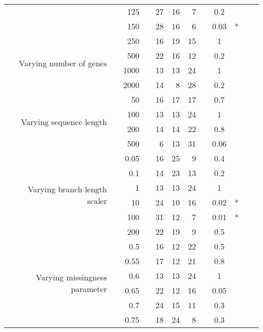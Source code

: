 \begin{table}[!h]
\begin{tabular}{r r r l r r r l c c c l}
   & & 125 & & 27 & 16 & 7 & & 0.2 &  &  &  \\
   & & 150 & & 28 & 16 & 6 & & 0.03 & * &  &  \\
\midrule
\multirow{ 4}{2cm}{Varying number of genes}
   & & 250 & & 16 & 19 & 15 & & 1 &  &  &  \\
   & & 500 & & 22 & 16 & 12 & & 0.2 &  &  &  \\
   & & 1000 & & 13 & 13 & 24 & & 1 &  &  &  \\
   & & 2000 & & 14 & 8 & 28 & & 0.2 &  &  &  \\
\midrule
\multirow{ 4}{2cm}{Varying sequence length}
   & & 50 & & 16 & 17 & 17 & & 0.7 &  &  &  \\
   & & 100 & & 13 & 13 & 24 & & 1 &  &  &  \\
   & & 200 & & 14 & 14 & 22 & & 0.8 &  &  &  \\
   & & 500 & & 6 & 13 & 31 & & 0.06 &  &  &  \\
\midrule
\multirow{ 6}{2cm}{Varying branch length scaler}
   & & 0.05 & & 16 & 25 & 9 & & 0.4 &  &  &  \\
   & & 0.1 & & 14 & 23 & 13 & & 0.2 &  &  &  \\
   & & 1 & & 13 & 13 & 24 & & 1 &  &  &  \\
   & & 10 & & 24 & 10 & 16 & & 0.02 & * &  &  \\
   & & 100 & & 31 & 12 & 7 & & 0.01 & * &  &  \\
   & & 200 & & 22 & 19 & 9 & & 0.5 &  &  &  \\
\midrule
\multirow{ 6}{2cm}{Varying missingness parameter}
   & & 0.5 & & 16 & 12 & 22 & & 0.5 &  &  &  \\
   & & 0.55 & & 17 & 12 & 21 & & 0.8 &  &  &  \\
   & & 0.6 & & 13 & 13 & 24 & & 1 &  &  &  \\
   & & 0.65 & & 22 & 12 & 16 & & 0.05 &  &  &  \\
   & & 0.7 & & 24 & 15 & 11 & & 0.3 &  &  &  \\
   & & 0.75 & & 18 & 24 & 8 & & 0.3 &  &  &  \\
\bottomrule
\end{tabular}
\end{table}

